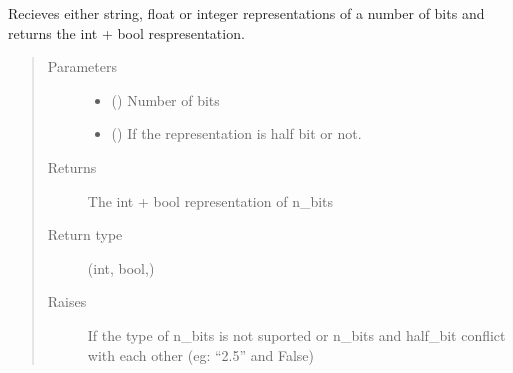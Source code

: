 \documentclass[letterpaper,10pt,english]{sphinxmanual}
\begin{document}
\begin{fulllineitems}
\label{\detokenize{gen:calib.gen.parse_bits}}
Recieves either string, float or integer representations of a number of
bits and returns the int + bool respresentation.
\begin{quote}\begin{description}
\item[{Parameters}] \leavevmode\begin{itemize}
\item {} 
 (\sphinxstyleliteralemphasis{\sphinxupquote{, }}\sphinxstyleliteralemphasis{\sphinxupquote{, }}) \textendash{} Number of bits

\item {} 
 () \textendash{} If the representation is half bit or not.

\end{itemize}

\item[{Returns}] \leavevmode
The int + bool representation of n\_bits

\item[{Return type}] \leavevmode
(int, bool,)

\item[{Raises}] \leavevmode
{} \textendash{} If the type of n\_bits is not suported or n\_bits and
half\_bit conflict with each other (eg: “2.5” and False)

\end{description}\end{quote}

\end{fulllineitems}

\end{document}
